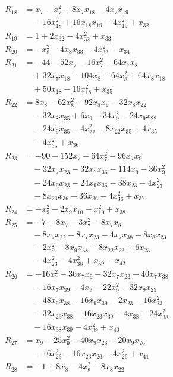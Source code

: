 \begin{align*}
R_{18}&=x_{7}-x_{7}^{2}+8x_{7}x_{18}-4x_{7}x_{19}\\
&\quad{}-16x_{18}^{2}+16x_{18}x_{19}-4x_{19}^{2}+x_{32}\\
R_{19}&=1+2x_{32}-4x_{32}^{2}+x_{33}\\
R_{20}&=-x_{8}^{2}-4x_{8}x_{33}-4x_{33}^{2}+x_{34}\\
R_{21}&=-44-52x_{7}-16x_{7}^{2}-64x_{7}x_{8}\\
&\quad{}+32x_{7}x_{18}-104x_{8}-64x_{8}^{2}+64x_{8}x_{18}\\
&\quad{}+50x_{18}-16x_{18}^{2}+x_{35}\\
R_{22}&=8x_{8}-62x_{8}^{2}-92x_{8}x_{9}-32x_{8}x_{22}\\
&\quad{}-32x_{8}x_{35}+6x_{9}-34x_{9}^{2}-24x_{9}x_{22}\\
&\quad{}-24x_{9}x_{35}-4x_{22}^{2}-8x_{22}x_{35}+4x_{35}\\
&\quad{}-4x_{35}^{2}+x_{36}\\
R_{23}&=-90-152x_{7}-64x_{7}^{2}-96x_{7}x_{9}\\
&\quad{}-32x_{7}x_{23}-32x_{7}x_{36}-114x_{9}-36x_{9}^{2}\\
&\quad{}-24x_{9}x_{23}-24x_{9}x_{36}-38x_{23}-4x_{23}^{2}\\
&\quad{}-8x_{23}x_{36}-36x_{36}-4x_{36}^{2}+x_{37}\\
R_{24}&=-x_{9}^{2}-2x_{9}x_{10}-x_{10}^{2}+x_{38}\\
R_{25}&=-7+8x_{7}-3x_{7}^{2}-8x_{7}x_{8}\\
&\quad{}-8x_{7}x_{22}-8x_{7}x_{23}-4x_{7}x_{38}-8x_{8}x_{23}\\
&\quad{}-2x_{9}^{2}-8x_{9}x_{38}-8x_{22}x_{23}+6x_{23}\\
&\quad{}-4x_{23}^{2}-4x_{38}^{2}+x_{39}-x_{42}\\
R_{26}&=-16x_{7}^{2}-36x_{7}x_{9}-32x_{7}x_{23}-40x_{7}x_{38}\\
&\quad{}-16x_{7}x_{39}-4x_{9}-22x_{9}^{2}-32x_{9}x_{23}\\
&\quad{}-48x_{9}x_{38}-16x_{9}x_{39}-2x_{23}-16x_{23}^{2}\\
&\quad{}-32x_{23}x_{38}-16x_{23}x_{39}-4x_{38}-24x_{38}^{2}\\
&\quad{}-16x_{38}x_{39}-4x_{39}^{2}+x_{40}\\
R_{27}&=x_{9}-25x_{9}^{2}-40x_{9}x_{23}-20x_{9}x_{26}\\
&\quad{}-16x_{23}^{2}-16x_{23}x_{26}-4x_{26}^{2}+x_{41}\\
R_{28}&=-1+8x_{8}-4x_{8}^{2}-8x_{8}x_{22}\\

\end{align*}
